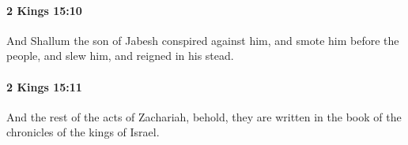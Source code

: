 		\paragraph{2 Kings 15:10} %
			\label{2KINGS-15-10}

			And Shallum the son of Jabesh conspired against him, and smote him before the people, and slew him, and reigned in his stead.


		\paragraph{2 Kings 15:11} %
			\label{2KINGS-15-11}

			And the rest of the acts of Zachariah, behold, they are written in the book of the chronicles of the kings of Israel.


